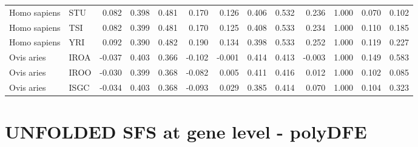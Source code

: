 \begin{longtable}{llrrrrrrrrrrr}
        Homo sapiens &                       STU &                              0.082 &                               0.398 &                 0.481 &                 0.170 &                              0.126 &                               0.406 &                 0.532 &                 0.236 &   1.000 &  0.070 &  0.102 \\
        Homo sapiens &                       TSI &                              0.082 &                               0.399 &                 0.481 &                 0.170 &                              0.125 &                               0.408 &                 0.533 &                 0.234 &   1.000 &  0.110 &  0.185 \\
        Homo sapiens &                       YRI &                              0.092 &                               0.390 &                 0.482 &                 0.190 &                              0.134 &                               0.398 &                 0.533 &                 0.252 &   1.000 &  0.119 &  0.227 \\
          Ovis aries &                      IROA &                             -0.037 &                               0.403 &                 0.366 &                -0.102 &                             -0.001 &                               0.414 &                 0.413 &                -0.003 &   1.000 &  0.149 &  0.583 \\
          Ovis aries &                      IROO &                             -0.030 &                               0.399 &                 0.368 &                -0.082 &                              0.005 &                               0.411 &                 0.416 &                 0.012 &   1.000 &  0.102 &  0.085 \\
          Ovis aries &                      ISGC &                             -0.034 &                               0.403 &                 0.368 &                -0.093 &                              0.029 &                               0.385 &                 0.414 &                 0.070 &   1.000 &  0.104 &  0.323 \\
\end{longtable}
\newpage\section*{UNFOLDED SFS at gene level - polyDFE} 
